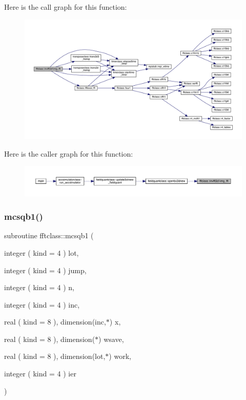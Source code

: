 Here is the call graph for this function\+:
\nopagebreak
\begin{figure}[H]
\begin{center}
\leavevmode
\includegraphics[width=350pt]{namespacefftclass_a374c599138aeca237d4c303a07a470ee_cgraph}
\end{center}
\end{figure}
Here is the caller graph for this function\+:\nopagebreak
\begin{figure}[H]
\begin{center}
\leavevmode
\includegraphics[width=350pt]{namespacefftclass_a374c599138aeca237d4c303a07a470ee_icgraph}
\end{center}
\end{figure}
\mbox{\label{namespacefftclass_a91e23ffaebaadf2b1c22e689f69996a2}} 
\subsubsection{\texorpdfstring{mcsqb1()}{mcsqb1()}}
{\footnotesize\ttfamily subroutine fftclass\+::mcsqb1 (\begin{DoxyParamCaption}\item[{integer ( kind = 4 )}]{lot,  }\item[{integer ( kind = 4 )}]{jump,  }\item[{integer ( kind = 4 )}]{n,  }\item[{integer ( kind = 4 )}]{inc,  }\item[{real ( kind = 8 ), dimension(inc,$\ast$)}]{x,  }\item[{real ( kind = 8 ), dimension($\ast$)}]{wsave,  }\item[{real ( kind = 8 ), dimension(lot,$\ast$)}]{work,  }\item[{integer ( kind = 4 )}]{ier }\end{DoxyParamCaption})}

